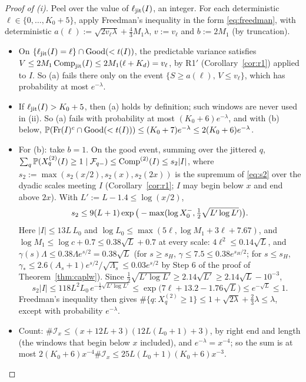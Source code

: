 \begin{proof}[Proof of (i)]
Peel over the value of $\ell_{\mathrm{jit}}(I)$, an integer. For each deterministic $\ell\in\{0,\dots,K_0+5\}$, apply Freedman's inequality in the
form \eqref{eq:freedman}, with deterministic $a(\ell):=\sqrt{2v_\ell\lambda}+\tfrac43M_1\lambda$, $v:=v_\ell$ and
$b:=2M_1$ (by truncation).
\begin{itemize}
\item On $\{\ell_{\mathrm{jit}}(I)=\ell\}\cap\mathrm{Good}(<t(I))$, the predictable variance satisfies
  $V\le2M_1\operatorname{Comp}_{\mathrm{jit}}(I)\le2M_1(\ell+K_d)=v_\ell$, by R1$'$ (Corollary~\ref{cor:r1}) applied to $I$. So (a) fails
  there only on the event $\{S\ge a(\ell),\,V\le v_\ell\}$, which has probability at most $e^{-\lambda}$.
\item If $\ell_{\mathrm{jit}}(I)>K_0+5$, then (a) holds by definition; such windows are never used in (ii). So (a) fails with
  probability at most $(K_0+6)e^{-\lambda}$, and with (b) below, $\mathbb{P}(\mathrm{Fr}(I)^c\cap\mathrm{Good}(<t(I)))\le(K_0+7)e^{-\lambda}\le2(K_0+6)e^{-\lambda}$.
\item For (b): take $b=1$. On the good event, summing over the jittered $q$,
  $\sum_q\mathbb{P}(X^{(2)}_q(I)\ge1\mid\mathcal F_{q-})\le\operatorname{Comp}^{(2)}(I)\le s_2|I|$, where $s_2:=\max(s_2(x/2),s_2(x),s_2(2x))$ is the
  supremum of \eqref{eq:s2} over the dyadic scales meeting $I$ (Corollary~\ref{cor:r1}; $I$ may begin below $x$ and end above $2x$).
  With $L':=L-1.4\le\log(x/2)$, \[s_2\le9(L+1)\exp\big(-\max(\log X_0^{-},\tfrac12\sqrt{L'\log L'})\big).\]
  Here $|I|\le13L\,L_0$ and $\log L_0\le\max(5\ell,\log M_1+3\ell+7.67)$, and $\log M_1\le\log c+0.7\le0.38\sqrt L+0.7$ at
  every scale: $4\ell^2\le0.14\sqrt L$, and $\gamma(s)\Lambda\le0.38\Lambda e^{s/2}=0.38\sqrt L$ (for $s\ge s_H$, $\gamma\le7.5\le
  0.38e^{s_H/2}$; for $s\le s_H$, $\gamma_*\le2.6(A_s+1)e^{s/2}/\sqrt{\Lambda_s}\le0.03e^{s/2}$ by Step 6 of the proof of
  Theorem~\ref{thm:caplw}). Since $\tfrac12\sqrt{L'\log L'}\ge2.14\sqrt{L'}\ge2.14\sqrt L-10^{-3}$,
  \[
  s_2|I|\le118L^2L_0\,e^{-\frac12\sqrt{L'\log L'}}\le\exp\big(7\ell+13.2-1.76\sqrt L\big)\le e^{-\sqrt L}\le1.
  \]
  Freedman's
  inequality then gives $\#\{q:X^{(2)}_q\ge1\}\le1+\sqrt{2\lambda}+\tfrac23\lambda\le\lambda$, except with probability
  $e^{-\lambda}$.
\item Count: $\#\mathcal I_x\le(x+12L+3)(12L(L_0+1)+3)$, by right end and length (the windows that begin below $x$ included),
  and $e^{-\lambda}=x^{-4}$; so the sum is at most $2(K_0+6)x^{-4}\#\mathcal I_x\le25L(L_0+1)(K_0+6)x^{-3}$. \qedhere
\end{itemize}
\end{proof}

